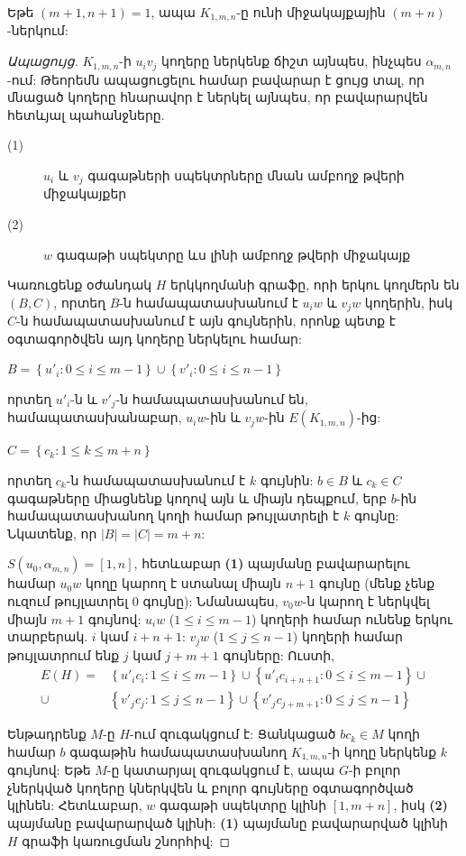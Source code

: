 \begin{theorem}
\label{t1_K1mn_coprime}
Եթե $(m+1,n+1)=1$, ապա $K_{1,m,n}$-ը ունի միջակայքային $(m+n)$-ներկում:
\end{theorem}
\begin{proof}[Ապացույց]
$K_{1,m,n}$-ի $u_iv_j$ կողերը ներկենք ճիշտ այնպես, ինչպես $\alpha_{m,n}$-ում: Թեորեմն ապացուցելու համար բավարար է ցույց տալ, որ մնացած կողերը հնարավոր է ներկել այնպես, որ բավարարվեն հետևյալ պահանջները.
\begin{description}
\item[(1)] $u_i$ և $v_j$ գագաթների սպեկտրները մնան ամբողջ թվերի միջակայքեր
\item[(2)] $w$ գագաթի սպեկտրը ևս լինի ամբողջ թվերի միջակայք
\end{description}
Կառուցենք օժանդակ $H$ երկկողմանի գրաֆը, որի երկու կողմերն են $(B,C)$, որտեղ $B$-ն համապատասխանում է $u_iw$ և $v_jw$ կողերին, իսկ $C$-ն համապատասխանում է այն գույներին, որոնք պետք է օգտագործվեն այդ կողերը ներկելու համար:
\begin{center}
$B = \left\{u'_i : 0 \leq i \leq m-1\right\} \cup \left\{v'_i : 0 \leq i
\leq n-1\right\}$
\end{center}
որտեղ $u'_i$-ն և $v'_j$-ն համապատասխանում են, համապատասխանաբար, $u_iw$-ին և $v_jw$-ին $E(K_{1,m,n})$-ից:

\begin{center}
$C = \left\{c_k : 1 \leq k \leq m+n\right\}$
\end{center}
որտեղ $c_k$-ն համապատասխանում է $k$ գույնին: $b\in B$ և
$c_k \in C$ գագաթները միացնենք կողով այն և միայն դեպքում, երբ $b$-ին համապատասխանող կողի համար թույլատրելի է $k$ գույնը: Նկատենք, որ $|B|=|C|=m+n$:

$S(u_0,\alpha_{m,n}) = [1,n]$, հետևաբար 
\textbf{(1)} պայմանը բավարարելու համար $u_0w$ կողը կարող է ստանալ միայն $n+1$ գույնը (մենք չենք ուզում թույլատրել $0$ գույնը): Նմանապես, $v_0w$-ն կարող է ներկվել միայն $m+1$ գույնով: $u_iw$
($1\leq i\leq m-1$) կողերի համար ունենք երկու տարբերակ. $i$ կամ $i+n+1$: $v_jw$ ($1
\leq j \leq n-1$) կողերի համար թույլատրում ենք $j$ կամ $j+m+1$ գույները: Ուստի,
\begin{align*}
E(H) = &\left\{u'_ic_i : 1 \leq i \leq m-1 \right\} \cup
\left\{u'_ic_{i+n+1} : 0 \leq i \leq m-1 \right\} \cup \\
\cup &\left\{v'_jc_j : 1 \leq j \leq n-1 \right\} \cup
\left\{v'_jc_{j+m+1} : 0 \leq j \leq n-1 \right\}
\end{align*}

Ենթադրենք $M$-ը $H$-ում զուգակցում է: Ցանկացած $bc_k \in M$ կողի համար 
$b$ գագաթին համապատասխանող $K_{1,m,n}$-ի կողը ներկենք $k$ գույնով: Եթե $M$-ը կատարյալ զուգակցում է, ապա $G$-ի բոլոր չներկված կողերը կներկվեն և բոլոր գույները օգտագործված կլինեն:
Հետևաբար, $w$ գագաթի սպեկտրը կլինի $[1,m+n]$, իսկ \textbf{(2)} պայմանը բավարարված կլինի: \textbf{(1)} պայմանը բավարարված կլինի $H$ գրաֆի կառուցման շնորհիվ:


\end{proof}
